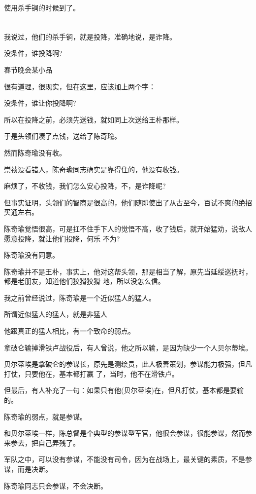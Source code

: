 \documentclass[11pt,a4paper,onecolumn]{article}
\begin{document}
使用杀手锏的时候到了。

\section[\thesection]{}

我说过，他们的杀手锏，就是投降，准确地说，是诈降。

没条件，谁投降啊?

\myrule 春节晚会某小品

很有道理，很现实，但在这里，应该加上两个字：

没条件，谁让你投降啊?

所以在投降之前，必须先送钱，就如同上次送给王朴那样。

于是头领们凑了点钱，送给了陈奇瑜。

然而陈奇瑜没有收。

崇祯没看错人，陈奇瑜同志确实是靠得住的，他没有收钱。

麻烦了，不收钱，我们怎么安心投降，不，是诈降呢?

但事实证明，头领们的智商是很高的，他们随即使出了从古至今，百试不爽的绝招\myrule 买通左右。

陈奇瑜觉悟很高，可是扛不住手下人的觉悟不高，收了钱后，就开始猛劝，说敌人愿意投降，就让他们投降，何乐
不为?

陈奇瑜没有同意。

陈奇瑜并不是王朴，事实上，他对这帮头领，那是相当了解，原先当延绥巡抚时，都是老朋友，知道他们狡猾狡猾
地，所以没怎么信。

我之前曾经说过，陈奇瑜是一个近似猛人的猛人。

所谓近似猛人的猛人，就是非猛人

他跟真正的猛人相比，有一个致命的弱点。

拿破仑输掉滑铁卢战役后，有人曾说，他之所以输，是因为缺少一个人\myrule 贝尔蒂埃。

贝尔蒂埃是拿破仑的参谋长，原先是测绘员，此人极善策划，参谋能力极强，但凡打仗，只要他在，基本都打赢
了，当时，他不在滑铁卢。

但最后，有人补充了一句：如果只有他(贝尔蒂埃)在，但凡打仗，基本都是要输的。

陈奇瑜的弱点，就是参谋。

和贝尔蒂埃一样，陈总督是个典型的参谋型军官，他很会参谋，很能参谋，然而参来参去，把自己弄残了。

军队之中，可以没有参谋，不能没有司令，因为在战场上，最关键的素质，不是参谋，而是决断。

陈奇瑜同志只会参谋，不会决断。
\end{document}
